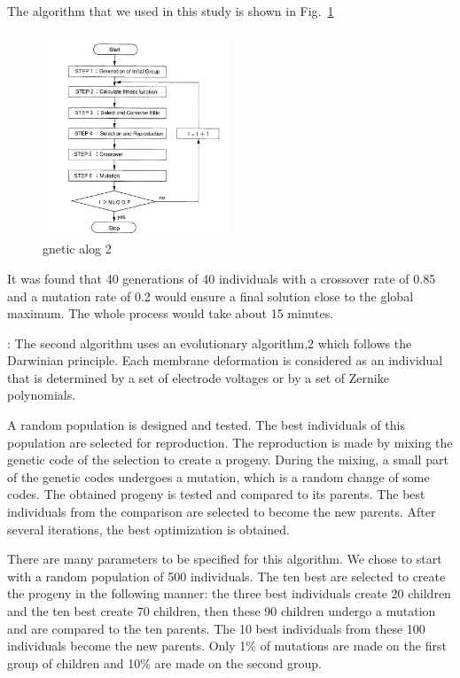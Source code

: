 The algorithm that we used in this study is shown in Fig.~\ref{fig:genetic_algor2}
\begin{figure}
	\centering
		\includegraphics[width=0.50\textwidth]{images/genetic_algor2.jpg}
	\caption{gnetic alog 2 \cite{Genetic_closed_loop}}
	\label{fig:genetic_algor2}
\end{figure}

It was found that 40 generations of 40 individuals with a crossover rate of 0.85 and a mutation rate of 0.2 would ensure a final solution close to the global maximum. The whole process would take about 15 minutes.


\cite{Genetic_fiber_coupling}:\newline
The second algorithm uses an evolutionary algorithm,2 which follows the Darwinian principle. Each membrane deformation is considered as an individual that is determined by a set of electrode voltages or by a set of Zernike polynomials. 

A random population is designed and tested. The best individuals of this population are selected for reproduction. The reproduction is made by mixing the genetic code of the selection to create a progeny. During the mixing, a small part of the genetic codes undergoes a mutation, which is a random change of some codes. The obtained progeny is tested and compared to its parents. The best individuals from the comparison are selected to become the new parents. After several iterations, the best optimization is obtained.

There are many parameters to be specified for this algorithm. We chose to start with a random population of 500 individuals. The ten best are selected to create the progeny in the following manner: the three best individuals create 20 children and the ten best create 70 children, then these 90 children undergo a mutation and are compared to the ten parents. The 10 best individuals from these 100 individuals become the new parents. Only 1\% of mutations are made on the first group of children and 10\% are made on the second group.

